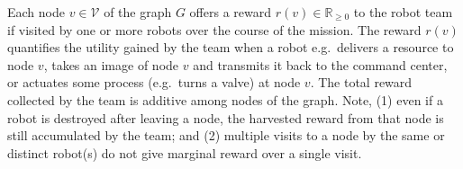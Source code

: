 \documentclass[11pt, oneside]{article}
\begin{document}



Each node $v\in \mathcal{V}$ of the graph $G$ offers a reward $r(v) \in  \mathbb{R}_{\geq 0}$ to the robot team if visited by one or more robots over the course of the mission.
The reward $r(v)$ quantifies the utility gained by the team when a robot e.g.\ delivers a resource to node $v$, takes an image of node $v$ and transmits it back to the command center, or actuates some process (e.g.\ turns a valve) at node $v$. 
The total reward collected by the team is additive among nodes of the graph. %
Note, 
(1) even if a robot is destroyed after leaving a node, the harvested reward from that node is still accumulated by the team; and
(2) multiple visits to a node by the same or distinct robot(s) do not give marginal reward over a single visit. %




\end{document}
